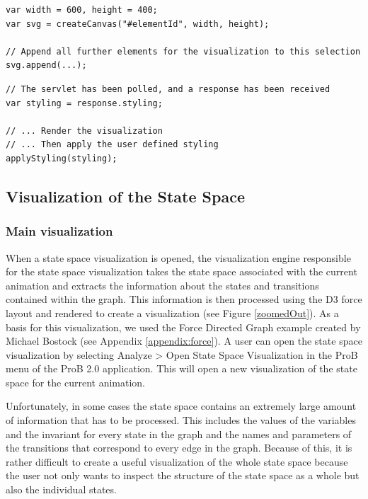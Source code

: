 \begin{lstlisting}[caption=Append a D3 selection to an element that includes support for zooming,label=canvas]
var width = 600, height = 400;
var svg = createCanvas("#elementId", width, height);

// Append all further elements for the visualization to this selection
svg.append(...);
\end{lstlisting}

\begin{lstlisting}[caption=Apply list of \texttt{Transformers} received from servlet,label=applyStyling]
// The servlet has been polled, and a response has been received
var styling = response.styling;

// ... Render the visualization
// ... Then apply the user defined styling
applyStyling(styling);
\end{lstlisting}

\subsection{Visualization of the State Space}

\subsubsection{Main visualization}

When a state space visualization is opened, the visualization engine responsible for the state space visualization takes the state space associated with the current animation and extracts the information about the states and transitions contained within the graph. This information is then processed using the D3 force layout and rendered to create a visualization (see Figure \ref{zoomedOut}). As a basis for this visualization, we used the Force Directed Graph example created by Michael Bostock (see Appendix \ref{appendix:force}). A user can open the state space visualization by selecting \textsf{Analyze > Open State Space Visualization} in the \textsf{ProB} menu of the ProB 2.0 application. This will open a new visualization of the state space for the current animation. 

Unfortunately, in some cases the state space contains an extremely large amount of information that has to be processed. This includes the values of the variables and the invariant for every state in the graph and the names and parameters of the transitions that correspond to every edge in the graph. Because of this, it is rather difficult to create a useful visualization of the whole state space because the user not only wants to inspect the structure of the state space as a whole but also the individual states. 

